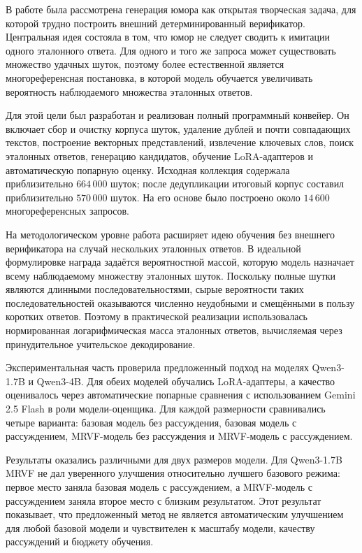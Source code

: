 В работе была рассмотрена генерация юмора как открытая творческая задача, для которой трудно построить внешний детерминированный верификатор. Центральная идея состояла в том, что юмор не следует сводить к имитации одного эталонного ответа. Для одного и того же запроса может существовать множество удачных шуток, поэтому более естественной является многореференсная постановка, в которой модель обучается увеличивать вероятность наблюдаемого множества эталонных ответов.

Для этой цели был разработан и реализован полный программный конвейер. Он включает сбор и очистку корпуса шуток, удаление дублей и почти совпадающих текстов, построение векторных представлений, извлечение ключевых слов, поиск эталонных ответов, генерацию кандидатов, обучение LoRA-адаптеров и автоматическую попарную оценку. Исходная коллекция содержала приблизительно \(664\,000\) шуток; после дедупликации итоговый корпус составил приблизительно \(570\,000\) шуток. На его основе было построено около \(14\,600\) многореференсных запросов.

На методологическом уровне работа расширяет идею обучения без внешнего верификатора на случай нескольких эталонных ответов. В идеальной формулировке награда задаётся вероятностной массой, которую модель назначает всему наблюдаемому множеству эталонных шуток. Поскольку полные шутки являются длинными последовательностями, сырые вероятности таких последовательностей оказываются численно неудобными и смещёнными в пользу коротких ответов. Поэтому в практической реализации использовалась нормированная логарифмическая масса эталонных ответов, вычисляемая через принудительное учительское декодирование.

Экспериментальная часть проверила предложенный подход на моделях Qwen3-1.7B и Qwen3-4B. Для обеих моделей обучались LoRA-адаптеры, а качество оценивалось через автоматические попарные сравнения с использованием Gemini 2.5 Flash в роли модели-оценщика. Для каждой размерности сравнивались четыре варианта: базовая модель без рассуждения, базовая модель с рассуждением, MRVF-модель без рассуждения и MRVF-модель с рассуждением.

Результаты оказались различными для двух размеров модели. Для Qwen3-1.7B MRVF не дал уверенного улучшения относительно лучшего базового режима: первое место заняла базовая модель с рассуждением, а MRVF-модель с рассуждением заняла второе место с близким результатом. Этот результат показывает, что предложенный метод не является автоматическим улучшением для любой базовой модели и чувствителен к масштабу модели, качеству рассуждений и бюджету обучения.

